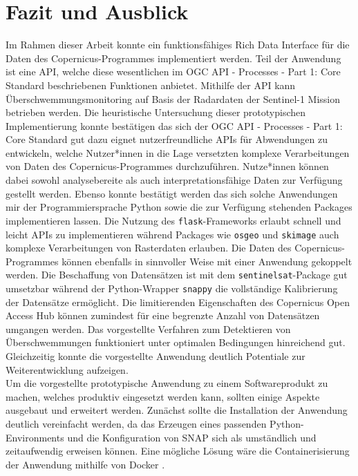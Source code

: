 \restoregeometry
\section{Fazit und Ausblick}
Im Rahmen dieser Arbeit konnte ein funktionsfähiges Rich Data Interface für die Daten des Copernicus-Programmes 
implementiert werden. Teil der Anwendung ist eine 
API, welche diese wesentlichen im OGC API - Processes - Part 1: Core Standard beschriebenen Funktionen anbietet. 
Mithilfe der API kann Überschwemmungsmonitoring auf Basis der Radardaten der Sentinel-1 Mission betrieben werden. 
Die heuristische Untersuchung dieser prototypischen Implementierung konnte bestätigen das sich der OGC API - Processes - Part 1: Core
Standard gut dazu eignet nutzerfreundliche APIs für Abwendungen zu entwickeln, welche Nutzer*innen in die 
Lage versetzten komplexe Verarbeitungen von Daten des Copernicus-Programmes durchzuführen. 
Nutze*innen können dabei sowohl analysebereite als auch interpretationsfähige Daten zur Verfügung gestellt werden.
Ebenso konnte bestätigt werden das sich solche Anwendungen mir der Programmiersprache Python sowie die zur Verfügung stehenden Packages
implementieren lassen. Die Nutzung des \verb|flask|-Frameworks erlaubt schnell und leicht APIs zu implementieren während Packages wie 
\verb|osgeo| und \verb|skimage| auch komplexe Verarbeitungen von Rasterdaten erlauben. Die Daten des Copernicus-Programmes 
können ebenfalls in sinnvoller Weise mit einer Anwendung gekoppelt werden. Die Beschaffung von Datensätzen ist mit dem 
\verb|sentinelsat|-Package gut umsetzbar während der Python-Wrapper \verb|snappy| die vollständige Kalibrierung der Datensätze ermöglicht. 
Die limitierenden Eigenschaften des Copernicus Open Access Hub können zumindest für eine begrenzte Anzahl von Datensätzen umgangen werden.
Das vorgestellte Verfahren zum Detektieren von Überschwemmungen funktioniert unter optimalen Bedingungen hinreichend gut.
Gleichzeitig konnte die vorgestellte Anwendung deutlich Potentiale zur Weiterentwicklung aufzeigen. \\


Um die vorgestellte prototypische Anwendung zu einem Softwareprodukt zu machen, welches produktiv eingesetzt werden 
kann, sollten einige Aspekte ausgebaut und erweitert werden. 
Zunächst sollte die Installation der Anwendung deutlich vereinfacht werden, da das Erzeugen eines passenden Python-Environments und 
die Konfiguration von SNAP sich als umständlich und zeitaufwendig erweisen können. 
Eine mögliche Lösung wäre die Containerisierung der Anwendung mithilfe von Docker \cite{testbed_16}. 

